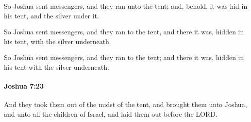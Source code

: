 			\begin{versebox}
					\item[BHS] 
					\item[ASV] So Joshua sent messengers, and they ran unto the tent; and, behold, it was hid in his tent, and the silver under it.
					\item[NIV] So Joshua sent messengers, and they ran to the tent, and there it was, hidden in his tent, with the silver underneath.
					\item[NRSV] So Joshua sent messengers, and they ran to the tent; and there it was, hidden in his tent with the silver underneath.
			\end{versebox}

		\paragraph{Joshua 7:23} %
			\label{JOSHUA-7-23}

			And they took them out of the midst of the tent, and brought them unto Joshua, and unto all the children of Israel, and laid them out before the LORD.

